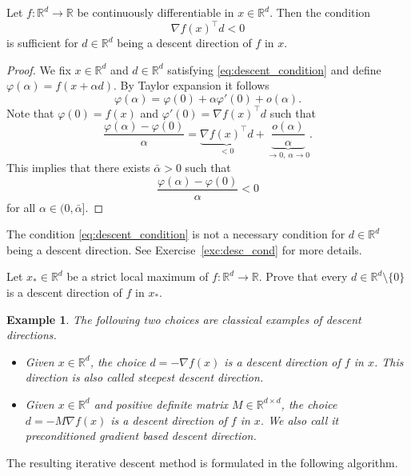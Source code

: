 \documentclass[12pt,openany]{book}
\newtheorem{example}[thm]{Example}
\theoremstyle{definition}
\theoremstyle{definition}
\newcommand{\R}{\mathbb{R}}
\begin{document}
\begin{lemma}\label{lem:descent_condition}
Let $f:\R^d\to\R$ be continuously differentiable in $x\in\R^d$. Then the condition 
\begin{equation}\label{eq:descent_condition}
\nabla f(x)^\top d <0
\end{equation}
is sufficient for $d\in\R^d$ being a descent direction of $f$ in $x$.
\end{lemma}
\begin{proof}
We fix $x\in\R^d$ and $d\in\R^d$ satisfying \eqref{eq:descent_condition} and define $\varphi(\alpha) = f(x+\alpha d)$. By Taylor expansion it follows
\[\varphi(\alpha) = \varphi(0) + \alpha \varphi'(0) + o(\alpha). \]
Note that $\varphi(0) = f(x)$ and $\varphi'(0) = \nabla f(x)^\top d$ such that
\[ \frac{\varphi(\alpha)- \varphi(0)}{\alpha} = \underbrace{\nabla f(x)^\top d}_{<0}+ \underbrace{\frac{o(\alpha)}{\alpha}}_{\to 0,\ \alpha\to 0}.\]
This implies that there exists $\bar\alpha>0$ such that 
\[\frac{\varphi(\alpha)-\varphi(0)}{\alpha} < 0 \]
for all $\alpha\in(0,\bar\alpha]$.
\end{proof}

The condition \eqref{eq:descent_condition} is not a necessary condition for $d\in\R^d$ being a descent direction. See Exercise~\ref{exc:desc_cond} for more details.

\begin{exercise}\label{exc:desc_cond}
Let $x_\ast\in\R^d$ be a strict local maximum of $f:\R^d\to\R$. Prove that every $d\in\R^d\setminus\{0\}$ is a descent direction of $f$ in $x_\ast$. 
\end{exercise}

\begin{example}
The following two choices are classical examples of descent directions.
\begin{itemize}
\item Given $x\in\R^d$, the choice $d=-\nabla f(x)$ is a descent direction of $f$ in $x$. This direction is also called \textit{steepest descent direction}.
\item Given $x\in\R^d$ and positive definite matrix $M\in\R^{d\times d}$, the choice $d=-M\nabla f(x)$ is a descent direction of $f$ in $x$. We also call it \textit{preconditioned gradient based descent direction}.
\end{itemize}
\end{example}

The resulting iterative descent method is formulated in the following algorithm.
\end{document}
